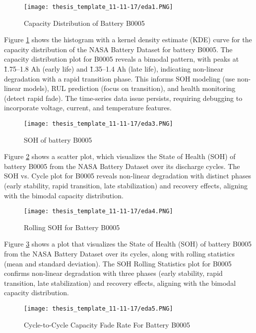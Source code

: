 \begin{figure}
    \centering
    \texttt{[image: thesis\_template\_11-11-17/eda1.PNG]}
    \caption{Capacity Distribution of Battery B0005}
    \label{fig:capacity}
\end{figure}

Figure \ref{fig:capacity} shows the histogram with a kernel density estimate (KDE) curve for the capacity distribution of the NASA Battery Dataset for battery B0005. The capacity distribution plot for B0005 reveals a bimodal pattern, with peaks at \~1.75–1.8 Ah (early life) and \~1.35–1.4 Ah (late life), indicating non-linear degradation with a rapid transition phase. This informs SOH modeling (use non-linear models), RUL prediction (focus on transition), and health monitoring (detect rapid fade). The time-series data issue persists, requiring debugging to incorporate voltage, current, and temperature features.

\begin{figure}
    \centering
    \texttt{[image: thesis\_template\_11-11-17/eda3.PNG]}
    \caption{SOH of battery B0005}
    \label{fig:sohB0005}
\end{figure}

Figure \ref{fig:sohB0005} shows a scatter plot, which visualizes the State of Health (SOH) of battery B0005 from the NASA Battery Dataset over its discharge cycles. The SOH vs. Cycle plot for B0005 reveals non-linear degradation with distinct phases (early stability, rapid transition, late stabilization) and recovery effects, aligning with the bimodal capacity distribution.

\begin{figure}
    \centering
    \texttt{[image: thesis\_template\_11-11-17/eda4.PNG]}
    \caption{Rolling SOH for Battery B0005}
    \label{fig:rollSOH}
\end{figure}

Figure \ref{fig:rollSOH} shows a plot that visualizes the State of Health (SOH) of battery B0005 from the NASA Battery Dataset over its cycles, along with rolling statistics (mean and standard deviation). The SOH Rolling Statistics plot for B0005 confirms non-linear degradation with three phases (early stability, rapid transition, late stabilization) and recovery effects, aligning with the bimodal capacity distribution.

\begin{figure}
    \centering
    \texttt{[image: thesis\_template\_11-11-17/eda5.PNG]}
    \caption{Cycle-to-Cycle Capacity Fade Rate For Battery B0005}
    \label{fig:cycle-to-cycle}
\end{figure}

